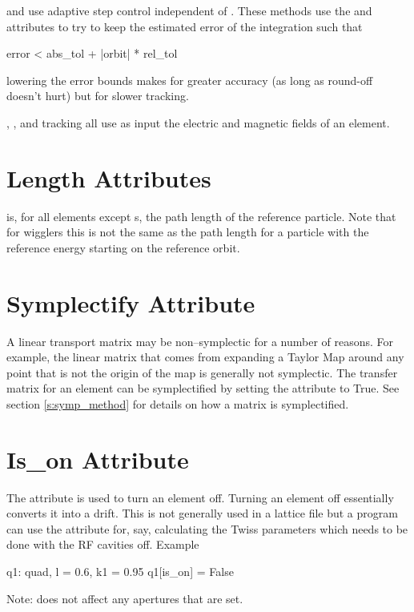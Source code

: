  and  use adaptive step
control independent of . These methods use the  and
 attributes to try to keep the estimated error of the integration
such that
\begin{example}
  error < abs\_tol + |orbit| * rel_tol
\end{example}
lowering the error bounds makes for greater accuracy (as long as round-off 
doesn't hurt) but for slower tracking. 

, , and  tracking all use
as input the electric and magnetic fields of an element. 

\section{Length Attributes}
\label{s:l}

 is, for all elements except s, the path length 
of the reference particle.
Note that for wigglers this is not the same as the path length for
a particle with the reference energy starting on the reference orbit.

\section{Symplectify Attribute}
\label{s:symp}

A linear transport matrix may be non--symplectic for a number of reasons.
For example, the linear matrix that comes from expanding a Taylor Map
around any point that is not the origin of the map is generally not 
symplectic. The transfer matrix for an element can be symplectified by
setting the  attribute to True. See section \ref{s:symp_method}
for details on how a matrix is symplectified.


\section{Is\_on Attribute}
\label{s:is_on}

The  attribute is used to turn an element off. Turning
an element off essentially converts it into a drift. This is not
generally used in a lattice file but a program can use the attribute
for, say, calculating the Twiss parameters which needs to be done
with the RF cavities off. Example
\begin{example}
  q1: quad, l = 0.6, k1 = 0.95
  q1[is_on] = False
\end{example}
Note:  does not affect any apertures that are set.
